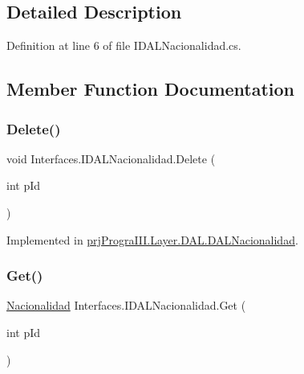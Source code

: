 \subsection{Detailed Description}


Definition at line 6 of file I\+D\+A\+L\+Nacionalidad.\+cs.



\subsection{Member Function Documentation}
\hypertarget{interface_interfaces_1_1_i_d_a_l_nacionalidad_ab50e49973f4bce541e8a39d9f5b344bd}{}\label{interface_interfaces_1_1_i_d_a_l_nacionalidad_ab50e49973f4bce541e8a39d9f5b344bd} 
\subsubsection{\texorpdfstring{Delete()}{Delete()}}
{\footnotesize\ttfamily void Interfaces.\+I\+D\+A\+L\+Nacionalidad.\+Delete (\begin{DoxyParamCaption}\item[{int}]{p\+Id }\end{DoxyParamCaption})}



Implemented in \hyperlink{classprj_progra_i_i_i_1_1_layer_1_1_d_a_l_1_1_d_a_l_nacionalidad_a4ff0c7613c26c969e5f515bbebad5652}{prj\+Progra\+I\+I\+I.\+Layer.\+D\+A\+L.\+D\+A\+L\+Nacionalidad}.

\hypertarget{interface_interfaces_1_1_i_d_a_l_nacionalidad_a1a283052260a80ed1d3a94d2e1dc520e}{}\label{interface_interfaces_1_1_i_d_a_l_nacionalidad_a1a283052260a80ed1d3a94d2e1dc520e} 
\subsubsection{\texorpdfstring{Get()}{Get()}}
{\footnotesize\ttfamily \hyperlink{classprj_progra_i_i_i_1_1_layer_1_1_entities_1_1_nacionalidad}{Nacionalidad} Interfaces.\+I\+D\+A\+L\+Nacionalidad.\+Get (\begin{DoxyParamCaption}\item[{int}]{p\+Id }\end{DoxyParamCaption})}



